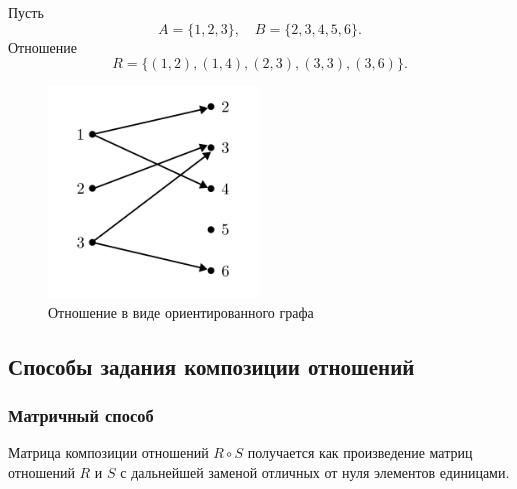 \begin{example*}
    Пусть
    \[
        A = \{1, 2, 3\},
        \quad
        B = \{2, 3, 4, 5, 6\}.
    \]
    Отношение
    \[
        R = \{(1, 2), (1, 4), (2, 3), (3, 3), (3, 6)\}.
    \]
    \begin{figure}[H]
        \centering
        \includegraphics[width=0.5\textwidth]{images/relation-graph.png}
        \caption{Отношение в виде ориентированного графа}
    \end{figure}
\end{example*}

\subsection{Способы задания композиции отношений}

\subsubsection{Матричный способ}

Матрица композиции отношений \(R \circ S\) получается как произведение матриц отношений \(R\) и \(S\) с дальнейшей заменой отличных от нуля элементов единицами.

